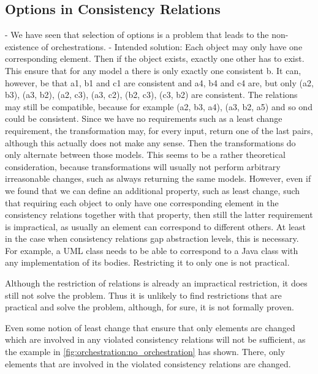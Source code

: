 \subsection{Options in Consistency Relations}


- We have seen that selection of options is a problem that leads to the non-existence of orchestrations.
- Intended solution: Each object may only have one corresponding element. Then if the object exists, exactly one other has to exist. This ensure that for any model a there is only exactly one consistent b.
It can, however, be that a1, b1 and c1 are consistent and a4, b4 and c4 are, but only (a2, b3), (a3, b2), (a2, c3), (a3, c2), (b2, c3), (c3, b2) are consistent. 
The relations may still be compatible, because for example (a2, b3, a4), (a3, b2, a5) and so ond could be consistent.
Since we have no requirements such as a least change requirement, the transformation may, for every input, return one of the last pairs, although this actually does not make any sense.
Then the transformations do only alternate between those models.
This seems to be a rather theoretical consideration, because transformations will usually not perform arbitrary irreasonable changes, such as always returning the same models.
However, even if we found that we can define an additional property, such as least change, such that requiring each object to only have one corresponding element in the consistency relations together with that property, then still the latter requirement is impractical, as usually an element can correspond to different others.
At least in the case when consistency relations gap abstraction levels, this is necessary.
For example, a UML class needs to be able to correspond to a Java class with any implementation of its bodies. Restricting it to only one is not practical.

Although the restriction of relations is already an impractical restriction, it does still not solve the problem.
Thus it is unlikely to find restrictions that are practical and solve the problem, although, for sure, it is not formally proven.

Even some notion of least change that ensure that only elements are changed which are involved in any violated consistency relations will not be sufficient, as the example in \autoref{fig:orchestration:no_orchestration} has shown.
There, only elements that are involved in the violated consistency relations are changed.


